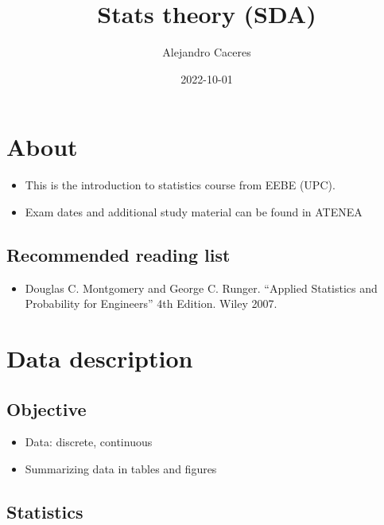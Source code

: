 \documentclass[
]{book}
\title{Stats theory (SDA)}
\author{Alejandro Caceres}
\date{2022-10-01}
\providecommand{\tightlist}{%
  \setlength{\itemsep}{0pt}\setlength{\parskip}{0pt}}
\begin{document}
\maketitle

{
\setcounter{tocdepth}{1}
\tableofcontents
}
\hypertarget{about}{%
\chapter{About}\label{about}}

\begin{itemize}
\item
  This is the introduction to statistics course from EEBE (UPC).
\item
  Exam dates and additional study material can be found in ATENEA
\end{itemize}

\hypertarget{recommended-reading-list}{%
\section{Recommended reading list}\label{recommended-reading-list}}

\begin{itemize}
\tightlist
\item
  Douglas C. Montgomery and George C. Runger. ``Applied Statistics and Probability for Engineers'' 4th Edition. Wiley 2007.
\end{itemize}

\hypertarget{data-description}{%
\chapter{Data description}\label{data-description}}

\hypertarget{objective}{%
\section{Objective}\label{objective}}

\begin{itemize}
\tightlist
\item
  Data: discrete, continuous
\item
  Summarizing data in tables and figures
\end{itemize}

\hypertarget{statistics}{%
\section{Statistics}\label{statistics}}
\end{document}
